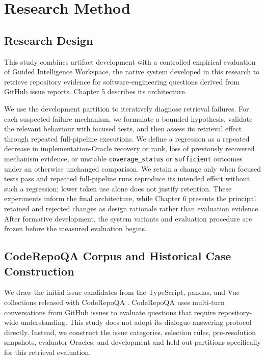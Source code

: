 \chapter{Research Method}\label{ch:research-method}

\section{Research Design}\label{sec:research-design}

This study combines artifact development with a controlled empirical evaluation of Guided Intelligence Workspace, the native system developed in this research to retrieve repository evidence for software-engineering questions derived from GitHub issue reports. Chapter 5 describes its architecture.

We use the development partition to iteratively diagnose retrieval failures. For each suspected failure mechanism, we formulate a bounded hypothesis, validate the relevant behaviour with focused tests, and then assess its retrieval effect through repeated full-pipeline executions. We define a regression as a repeated decrease in implementation-Oracle recovery or rank, loss of previously recovered mechanism evidence, or unstable \texttt{coverage\_status} or \texttt{sufficient} outcomes under an otherwise unchanged comparison. We retain a change only when focused tests pass and repeated full-pipeline runs reproduce its intended effect without such a regression; lower token use alone does not justify retention. These experiments inform the final architecture, while Chapter 6 presents the principal retained and rejected changes as design rationale rather than evaluation evidence. After formative development, the system variants and evaluation procedure are frozen before the measured evaluation begins.

\section{CodeRepoQA Corpus and Historical Case Construction}\label{sec:coderepoqa-corpus-and-historical-case-construction}

We draw the initial issue candidates from the TypeScript, pandas, and Vue collections released with CodeRepoQA \cite{Hu2025CodeRepoQA}. CodeRepoQA uses multi-turn conversations from GitHub issues to evaluate questions that require repository-wide understanding. This study does not adopt its dialogue-answering protocol directly. Instead, we construct the issue categories, selection rules, pre-resolution snapshots, evaluator Oracles, and development and held-out partitions specifically for this retrieval evaluation.

